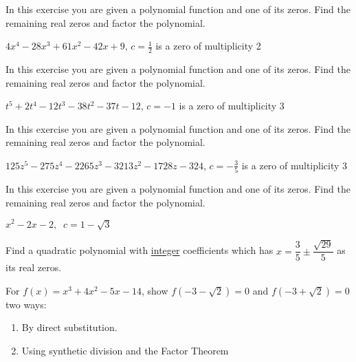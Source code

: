 \documentclass{ximera}
\begin{document}
\begin{problem}
In this exercise you are given a polynomial function and one of its zeros.  Find the remaining real zeros and factor the polynomial. 

$4x^{4} - 28x^{3} + 61x^{2} - 42x + 9$, $c = \frac{1}{2}$ is a zero of multiplicity 2 
\end{problem}

\begin{problem}
In this exercise you are given a polynomial function and one of its zeros.  Find the remaining real zeros and factor the polynomial. 

$t^5+2t^4-12t^3-38t^2-37t-12$, $c=-1$ is a zero of multiplicity 3
\end{problem}

\begin{problem}
In this exercise you are given a polynomial function and one of its zeros.  Find the remaining real zeros and factor the polynomial. 

$125z^{5} - 275z^{4} - 2265z^{3} - 3213z^{2} - 1728z - 324$, $c = -\frac{3}{5}$ is a zero of multiplicity 3
\end{problem}

\begin{problem}\label{factorpolyzerolast}
In this exercise you are given a polynomial function and one of its zeros.  Find the remaining real zeros and factor the polynomial. 

$x^{2} - 2x - 2, \;\; c = 1 - \sqrt{3}$
\end{problem}

\begin{problem}
Find a quadratic polynomial with \underline{integer} coefficients which has $x = \dfrac{3}{5} \pm \dfrac{\sqrt{29}}{5}$ as its real zeros. 
\end{problem}

\begin{problem}\label{verifyrootsex}

For $f(x) = x^3 + 4x^2-5x-14$, show $f(-3-\sqrt{2}) = 0$ and $f(-3+\sqrt{2}) = 0$ two ways:

\begin{enumerate}

\item  By direct substitution.

\item  Using synthetic division and the Factor Theorem

\end{enumerate}
\end{problem}
\end{document}
